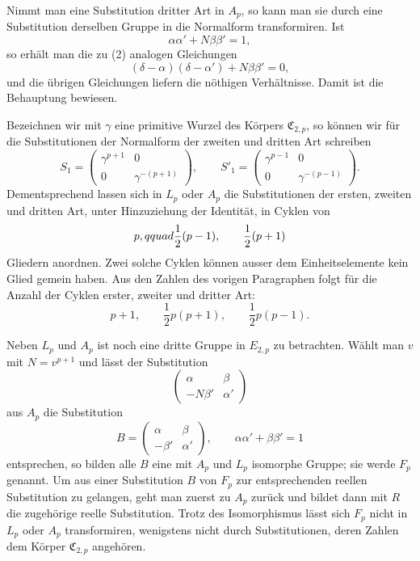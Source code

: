 \documentclass[11pt]{article}
\providecommand{\mat}[4]{\begin{pmatrix}#1&#2\\#3&#4\end{pmatrix}}
\providecommand{\mat}[4]{\begin{pmatrix}#1&#2\\#3&#4\end{pmatrix}}
\providecommand{\Cfield}{\mathfrak C}
\begin{document}
Nimmt man eine Substitution dritter Art in $A_p$, so kann man sie durch eine Substitution derselben Gruppe in die Normalform transformiren. Ist
\begin{equation}
 \alpha\alpha'+N\beta\beta'=1,
 \tag{4}
\end{equation}
so erhält man die zu (2) analogen Gleichungen
\begin{equation}
 (\delta-\alpha)(\delta-\alpha')+N\beta\beta'=0,
 \tag{5}
\end{equation}
und die übrigen Gleichungen liefern die nöthigen Verhältnisse. Damit ist die Behauptung bewiesen.

Bezeichnen wir mit $\gamma$ eine primitive Wurzel des Körpers $\Cfield_{2,p}$, so können wir für die Substitutionen der Normalform der zweiten und dritten Art schreiben
\begin{equation}
 S_1=\mat{\gamma^{p+1}}{0}{0}{\gamma^{-(p+1)}},\qquad
 S'_1=\mat{\gamma^{p-1}}{0}{0}{\gamma^{-(p-1)}}.
 \tag{6}
\end{equation}
Dementsprechend lassen sich in $L_p$ oder $A_p$ die Substitutionen der ersten, zweiten und dritten Art, unter Hinzuziehung der Identität, in Cyklen von
\[
 p,\\qquad \frac12(p-1),\qquad \frac12(p+1)
\]
Gliedern anordnen. Zwei solche Cyklen können ausser dem Einheitselemente kein Glied gemein haben. Aus den Zahlen des vorigen Paragraphen folgt für die Anzahl der Cyklen erster, zweiter und dritter Art:
\begin{equation}
 p+1,
 \qquad \frac12p(p+1),
 \qquad \frac12p(p-1).
 \tag{7}
\end{equation}

Neben $L_p$ und $A_p$ ist noch eine dritte Gruppe in $E_{2,p}$ zu betrachten. Wählt man $v$ mit $N=v^{p+1}$ und lässt der Substitution
\[
 \mat{\alpha}{\beta}{-N\beta'}{\alpha'}
\]
aus $A_p$ die Substitution
\begin{equation}
 B=\mat{\alpha}{\beta}{-\beta'}{\alpha'},
 \qquad \alpha\alpha'+\beta\beta'=1
 \tag{8}
\end{equation}
entsprechen, so bilden alle $B$ eine mit $A_p$ und $L_p$ isomorphe Gruppe; sie werde $F_p$ genannt. Um aus einer Substitution $B$ von $F_p$ zur entsprechenden reellen Substitution zu gelangen, geht man zuerst zu $A_p$ zurück und bildet dann mit $R$ die zugehörige reelle Substitution. Trotz des Isomorphismus lässt sich $F_p$ nicht in $L_p$ oder $A_p$ transformiren, wenigstens nicht durch Substitutionen, deren Zahlen dem Körper $\Cfield_{2,p}$ angehören.
\end{document}
